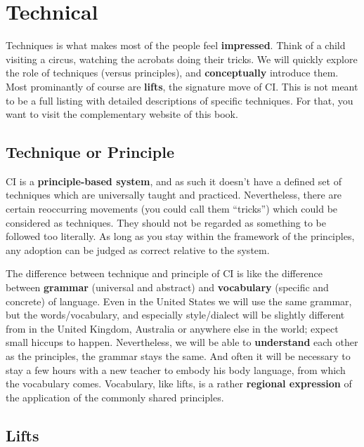 \chapter{Technical}\label{ch:technical}


Techniques is what makes most of the people feel \textbf{impressed}.
Think of a child visiting a circus, watching the acrobats doing their tricks.
We will quickly explore the role of techniques (versus principles), and \textbf{conceptually} introduce them.
Most prominantly of course are \textbf{lifts}, the signature move of CI\@.
This is not meant to be a full listing with detailed descriptions of specific techniques.
For that, you want to visit the complementary website of this book.

\section{Technique or Principle}\label{sec:technique-or-principle}

CI is a \textbf{principle-based system}, and as such it doesn't have a defined set of techniques which are universally taught and practiced.
Nevertheless, there are certain reoccurring movements (you could call them ``tricks'') which could be considered as techniques.
They should not be regarded as something to be followed too literally.
As long as you stay within the framework of the principles, any adoption can be judged as correct relative to the system.

The difference between technique and principle of CI is like the difference between \textbf{grammar} (universal and abstract) and \textbf{vocabulary} (specific and concrete) of language.
Even in the United States we will use the same grammar, but the words/vocabulary, and especially style/dialect will be slightly different from in the United Kingdom, Australia or anywhere else in the world; expect small hiccups to happen.
Nevertheless, we will be able to \textbf{understand} each other as the principles, the grammar stays the same.
And often it will be necessary to stay a few hours with a new teacher to embody his body language, from which the vocabulary comes.
Vocabulary, like lifts, is a rather \textbf{regional expression} of the application of the commonly shared principles.

\section{Lifts}\label{sec:lifts}

